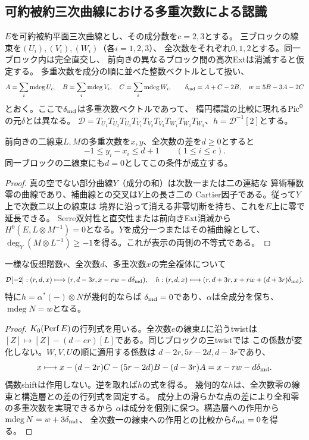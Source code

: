 \subsection{可約被約三次曲線における多重次数による認識}
\label{subsec:ou-reducible-multidegree}

$E$を可約被約平面三次曲線とし、その成分数を$c=2,3$とする。
三ブロックの線束を$(U_i),(V_i),(W_i)$（各$i=1,2,3$）、
全次数をそれぞれ$0,1,2$とする。同一ブロック内は完全直交し、
前向きの異なるブロック間の高次Extは消滅すると仮定する。
多重次数を成分の順に並べた整数ベクトルとして扱い、
\[
 A=\sum_i\operatorname{mdeg}U_i,\quad
 B=\sum_i\operatorname{mdeg}V_i,\quad
 C=\sum_i\operatorname{mdeg}W_i,\qquad
 \delta_{\rm md}=A+C-2B,\quad w=5B-3A-2C
\]
とおく。ここで$\delta_{\rm md}$は多重次数ベクトルであって、
楕円標識の比較に現れる$\operatorname{Pic}^0$の元$\delta$とは異なる。
$\mathcal D=T_{U_1}T_{U_2}T_{U_3}T_{V_1}T_{V_2}T_{V_3}
T_{W_1}T_{W_2}T_{W_3}$、$h=\mathcal D^{-1}[2]$とする。

\begin{lemma}[多重次数の有限範囲]\label{lem:ou-reduced-md-bounds}
前向きの二線束$L,M$の多重次数を$x,y$、全次数の差を$d\geq0$とすると
\[
 -1\leq y_i-x_i\leq d+1\qquad(1\leq i\leq c).
\]
同一ブロックの二線束にも$d=0$としてこの条件が成立する。
\end{lemma}
\begin{proof}
真の空でない部分曲線$Y$（成分の和）は次数一または二の連結な
算術種数零の曲線であり、補曲線との交叉は$Y$上の長さ二の
Cartier因子である。従って$Y$上で次数二以上の線束は
境界に沿って消える非零切断を持ち、これを$E$上に零で延長できる。
Serre双対性と直交性または前向きExt消滅から
$H^0(E,L\otimes M^{-1})=0$となる。$Y$を成分一つまたはその補曲線として、
$\deg_Y(M\otimes L^{-1})\geq-1$を得る。これが表示の両側の不等式である。
\end{proof}

\begin{proposition}[多重次数の作用]\label{prop:ou-reduced-md-action}
一様な仮想階数$r$、全次数$d$、多重次数$x$の完全複体について
\[
 \mathcal D[-2]:(r,d,x)\longmapsto(r,d-3r,x-rw-d\delta_{\rm md}),
\quad
 h:(r,d,x)\longmapsto(r,d+3r,x+rw+(d+3r)\delta_{\rm md}).
\]
特に$h=\alpha^*(-)\otimes N$が幾何的ならば
$\delta_{\rm md}=0$であり、$\alpha$は全成分を保ち、
$\operatorname{mdeg}N=w$となる。
\end{proposition}
\begin{proof}
$K_0(\operatorname{Perf} E)$の行列式を用いる。全次数$e$の線束$L$に沿うtwistは
$[Z]\mapsto[Z]-(d-er)[L]$である。同じブロックの三twistでは
この係数が変化しない。$W,V,U$の順に適用する係数は
$d-2r,5r-2d,d-3r$であり、
\[
 x\longmapsto x-(d-2r)C-(5r-2d)B-(d-3r)A
 =x-rw-d\delta_{\rm md}.
\]
偶数shiftは作用しない。逆を取れば$h$の式を得る。
幾何的な$h$は、全次数零の線束と構造層との差の行列式を固定する。
成分上の滑らかな点の差により全和零の多重次数を実現できるから
$\alpha$は成分を個別に保つ。構造層への作用から
$\operatorname{mdeg}N=w+3\delta_{\rm md}$、
全次数一の線束への作用との比較から$\delta_{\rm md}=0$を得る。
\end{proof}

